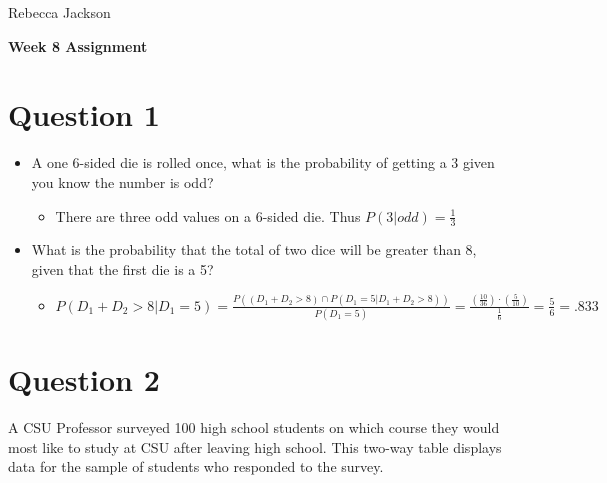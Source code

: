 \documentclass[12pt]{article}
\begin{document}
\hspace*{\fill} Rebecca Jackson
\\
\begin{center}
\huge
\textbf{Week 8 Assignment}
\end{center}
\normalsize

\section*{Question 1}
  \begin{itemize}
    \item A one 6-sided die is rolled once, what is the probability of getting a 3 given you know the number is odd?
    \begin{itemize}
      \item There are three odd values on a 6-sided die. Thus $P(3|odd)=\frac{1}{3}$
    \end{itemize}
    \item What is the probability that the total of two dice will be greater than 8, given that the first die is a 5?
    \begin{itemize}
      \item $P(D_1+D_2 > 8 | D_1=5)= \frac{P((D_1+D_2 > 8) \cap P(D_1=5|D_1+D_2 > 8))}{P(D_1=5)}= \frac{(\frac{10}{36}) \cdot (\frac{5}{10})}{\frac{1}{6}}=\frac{5}{6}=.833$
    \end{itemize}
  \end{itemize}
\section*{Question 2}
A CSU Professor surveyed 100 high school students on which course they would most like to study at CSU after leaving high school. This two-way table displays data for the sample of students who responded to the survey.
\\
\end{document}
